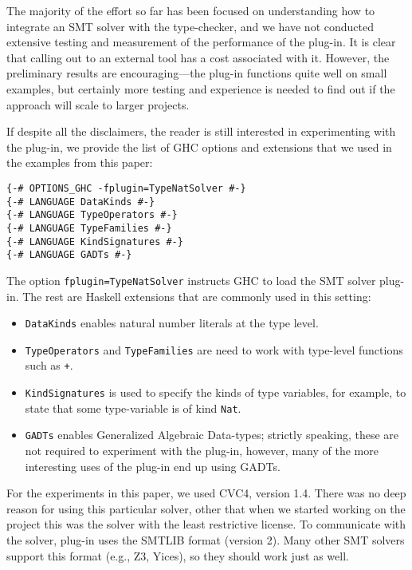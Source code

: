 \documentclass{sigplanconf}
\begin{document}
The majority of the effort so far has been focused on understanding how
to integrate an SMT solver with the type-checker, and we have not
conducted extensive testing and measurement of the performance of the plug-in.
It is clear that calling out to an external tool has a cost associated
with it.  However, the preliminary results are encouraging---the plug-in
functions quite well on small examples, but certainly more testing and
experience is needed to find out if the approach will scale to larger
projects.

If despite all the disclaimers, the reader is still interested in
experimenting with the plug-in, we provide the list of GHC options and
extensions that we used in the examples from this paper:

\begin{Verbatim}
{-# OPTIONS_GHC -fplugin=TypeNatSolver #-}
{-# LANGUAGE DataKinds #-}
{-# LANGUAGE TypeOperators #-}
{-# LANGUAGE TypeFamilies #-}
{-# LANGUAGE KindSignatures #-}
{-# LANGUAGE GADTs #-}
\end{Verbatim}

The option \Verb"fplugin=TypeNatSolver" instructs GHC to load the SMT solver
plug-in.  The rest are Haskell extensions that are commonly used in this
setting:

\break
\begin{itemize}
\item \Verb"DataKinds" enables natural number literals at the type
level.
\item \Verb"TypeOperators" and \Verb"TypeFamilies" are need to work
with type-level functions such as \Verb"+".
\item \Verb"KindSignatures" is used to specify the kinds of type variables,
for example, to state that some type-variable is of kind \Verb"Nat".
\item \Verb"GADTs" enables Generalized Algebraic Data-types;  strictly
speaking, these are not required to experiment with the plug-in, however,
many of the more interesting uses of the plug-in end up using GADTs.
\end{itemize}

For the experiments in this paper, we used CVC4, version 1.4.  There was
no deep reason for using this particular solver, other that when we started
working on the project this was the solver with the least restrictive license.
To communicate with the solver, plug-in uses the SMTLIB format (version 2).
Many other SMT solvers support this format (e.g., Z3, Yices), so they
should work just as well.
\end{document}
